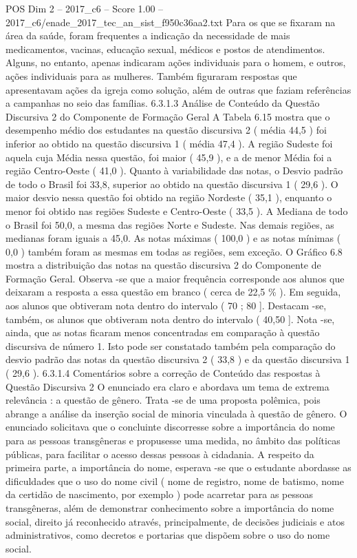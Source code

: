 \begin{textsample}{POS Dim 2 – 2017\_c6 – Score 1.00 – 2017\_c6/enade\_2017\_tec\_an\_sist\_f950c36aa2.txt}
Para os que se fixaram na área da saúde, foram frequentes a indicação da necessidade de mais medicamentos, vacinas, educação sexual, médicos e postos de atendimentos.
Alguns, no entanto, apenas indicaram ações individuais para o homem, e outros, ações individuais para as mulheres.
Também figuraram respostas que apresentavam ações da igreja como solução, além de outras que faziam referências a campanhas no seio das famílias. 6.3.1.3 Análise de Conteúdo da Questão Discursiva 2 do Componente de Formação Geral A Tabela 6.15 mostra que o desempenho médio dos estudantes na questão discursiva 2 ( média 44,5 ) foi inferior ao obtido na questão discursiva 1 ( média 47,4 ).
A região Sudeste foi aquela cuja Média nessa questão, foi maior ( 45,9 ), e a de menor Média foi a região Centro-Oeste ( 41,0 ).
Quanto à variabilidade das notas, o Desvio padrão de todo o Brasil foi 33,8, superior ao obtido na questão discursiva 1 ( 29,6 ).
O maior desvio nessa questão foi obtido na região Nordeste ( 35,1 ), enquanto o menor foi obtido nas regiões Sudeste e Centro-Oeste ( 33,5 ).
A Mediana de todo o Brasil foi 50,0, a mesma das regiões Norte e Sudeste.
Nas demais regiões, as medianas foram iguais a 45,0.
As notas máximas ( 100,0 ) e as notas mínimas ( 0,0 ) também foram as mesmas em todas as regiões, sem exceção.
O Gráfico 6.8 mostra a distribuição das notas na questão discursiva 2 do Componente de Formação Geral.
Observa -se que a maior frequência corresponde aos alunos que deixaram a resposta a essa questão em branco ( cerca de 22,5 \% ).
Em seguida, aos alunos que obtiveram nota dentro do intervalo ( 70 ; 80 ].
Destacam -se, também, os alunos que obtiveram nota dentro do intervalo ( 40,50 ].
Nota -se, ainda, que as notas ficaram menos concentradas em comparação à questão discursiva de número 1.
Isto pode ser constatado também pela comparação do desvio padrão das notas da questão discursiva 2 ( 33,8 ) e da questão discursiva 1 ( 29,6 ). 6.3.1.4 Comentários sobre a correção de Conteúdo das respostas à Questão Discursiva 2 O enunciado era claro e abordava um tema de extrema relevância : a questão de gênero.
Trata -se de uma proposta polêmica, pois abrange a análise da inserção social de minoria vinculada à questão de gênero.
O enunciado solicitava que o concluinte discorresse sobre a importância do nome para as pessoas transgêneras e propusesse uma medida, no âmbito das políticas públicas, para facilitar o acesso dessas pessoas à cidadania.
A respeito da primeira parte, a importância do nome, esperava -se que o estudante abordasse as dificuldades que o uso do nome civil ( nome de registro, nome de batismo, nome da certidão de nascimento, por exemplo ) pode acarretar para as pessoas transgêneras, além de demonstrar conhecimento sobre a importância do nome social, direito já reconhecido através, principalmente, de decisões judiciais e atos administrativos, como decretos e portarias que dispõem sobre o uso do nome social.

\end{textsample}

